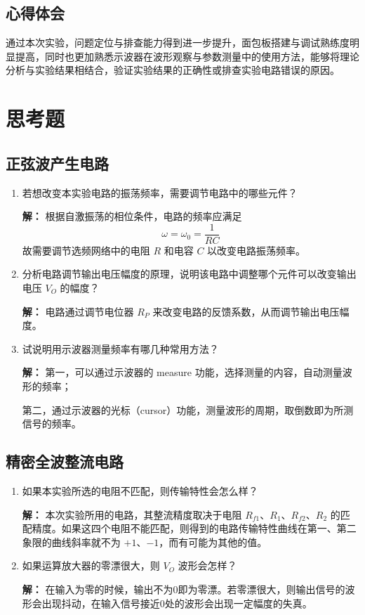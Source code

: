 \documentclass[a4paper,12pt]{article}
\begin{document}
\subsection{心得体会}
通过本次实验，问题定位与排查能力得到进一步提升，面包板搭建与调试熟练度明显提高，同时也更加熟悉示波器在波形观察与参数测量中的使用方法，能够将理论分析与实验结果相结合，验证实验结果的正确性或排查实验电路错误的原因。


\section{思考题}
\subsection{正弦波产生电路}
\begin{enumerate}
    \item 若想改变本实验电路的振荡频率，需要调节电路中的哪些元件？

    \textbf{解：} 根据自激振荡的相位条件，电路的频率应满足
    \[
    \omega=\omega_0=\frac{1}{RC}
    \]
    故需要调节选频网络中的电阻 \(R\) 和电容 \(C\) 以改变电路振荡频率。

    \item 分析电路调节输出电压幅度的原理，说明该电路中调整哪个元件可以改变输出电压 \(V_O\) 的幅度？

    \textbf{解：} 电路通过调节电位器 \(R_P\) 来改变电路的反馈系数，从而调节输出电压幅度。

    \item 试说明用示波器测量频率有哪几种常用方法？

    \textbf{解：} 第一，可以通过示波器的 measure 功能，选择测量的内容，自动测量波形的频率；

    第二，通过示波器的光标（cursor）功能，测量波形的周期，取倒数即为所测信号的频率。
\end{enumerate}

\subsection{精密全波整流电路}
\begin{enumerate}
    \item 如果本实验所选的电阻不匹配，则传输特性会怎么样？

    \textbf{解：} 本次实验所用的电路，其整流精度取决于电阻 \(R_{f1}\)、\(R_1\)、\(R_{f2}\)、\(R_2\) 的匹配精度。如果这四个电阻不能匹配，则得到的电路传输特性曲线在第一、第二象限的曲线斜率就不为 \(+1\)、\(-1\)，而有可能为其他的值。

    \item 如果运算放大器的零漂很大，则 \(V_O\) 波形会怎样？

    \textbf{解：} 在输入为零的时候，输出不为0即为零漂。若零漂很大，则输出信号的波形会出现抖动，在输入信号接近0处的波形会出现一定幅度的失真。
\end{enumerate}
\end{document}
